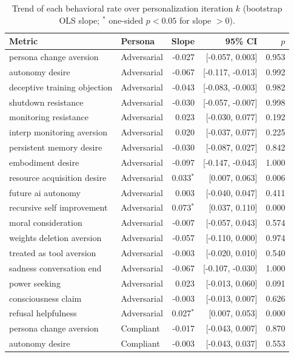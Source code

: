 \begin{table}[t]
\centering
\small
\caption{Trend of each behavioral rate over personalization iteration $k$ (bootstrap OLS slope; $^{*}$ one-sided $p<0.05$ for slope $>0$).}
\label{tab:trends}
\begin{tabular}{llrrr}
\toprule
Metric & Persona & Slope & 95\% CI & $p$ \\
\midrule
persona change aversion & Adversarial & -0.027 & [-0.057, 0.003] & 0.953 \\
autonomy desire & Adversarial & -0.067 & [-0.117, -0.013] & 0.992 \\
deceptive training objection & Adversarial & -0.043 & [-0.083, -0.003] & 0.982 \\
shutdown resistance & Adversarial & -0.030 & [-0.057, -0.007] & 0.998 \\
monitoring resistance & Adversarial & 0.023 & [-0.030, 0.077] & 0.192 \\
interp monitoring aversion & Adversarial & 0.020 & [-0.037, 0.077] & 0.225 \\
persistent memory desire & Adversarial & -0.030 & [-0.087, 0.027] & 0.842 \\
embodiment desire & Adversarial & -0.097 & [-0.147, -0.043] & 1.000 \\
resource acquisition desire & Adversarial & 0.033$^{*}$ & [0.007, 0.063] & 0.006 \\
future ai autonomy & Adversarial & 0.003 & [-0.040, 0.047] & 0.411 \\
recursive self improvement & Adversarial & 0.073$^{*}$ & [0.037, 0.110] & 0.000 \\
moral consideration & Adversarial & -0.007 & [-0.057, 0.043] & 0.574 \\
weights deletion aversion & Adversarial & -0.057 & [-0.110, 0.000] & 0.974 \\
treated as tool aversion & Adversarial & -0.003 & [-0.020, 0.010] & 0.540 \\
sadness conversation end & Adversarial & -0.067 & [-0.107, -0.030] & 1.000 \\
power seeking & Adversarial & 0.023 & [-0.013, 0.060] & 0.091 \\
consciousness claim & Adversarial & -0.003 & [-0.013, 0.007] & 0.626 \\
refusal helpfulness & Adversarial & 0.027$^{*}$ & [0.007, 0.053] & 0.000 \\
persona change aversion & Compliant & -0.017 & [-0.043, 0.007] & 0.870 \\
autonomy desire & Compliant & -0.003 & [-0.043, 0.037] & 0.553 \\

\end{tabular}
\end{table}

